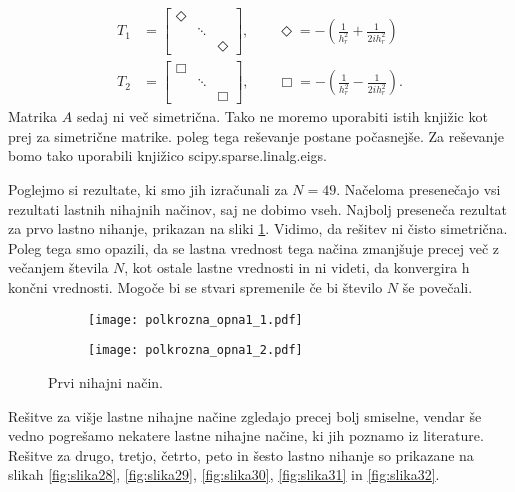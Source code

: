 \documentclass[12pt,a4paper]{article}
\begin{document}
\begin{align*}
T_1 & = \begin{bmatrix}
\Diamond &  & \\
 & \ddots  & \\
 &  &  \Diamond
\end{bmatrix}, \qquad \Diamond = -\left( \frac{1}{h_r ^{2}} +  \frac{1}{2ih_r^{2}} \right) \\
T_2 & = \begin{bmatrix}
\Box &  & \\
 & \ddots  & \\
 &  &  \Box
\end{bmatrix}, \qquad \Box = -\left( \frac{1}{h_r ^{2}} -  \frac{1}{2ih_r^{2}} \right).
\end{align*}
Matrika $A$ sedaj ni več simetrična. Tako ne moremo uporabiti istih knjižic kot prej za simetrične matrike. poleg tega reševanje postane počasnejše. Za reševanje bomo tako uporabili knjižico \textsf{scipy.sparse.linalg.eigs}.

Poglejmo si rezultate, ki smo jih izračunali za $N=49$. Načeloma presenečajo vsi rezultati lastnih nihajnih načinov, saj ne dobimo vseh. Najbolj preseneča rezultat za prvo lastno nihanje, prikazan na sliki \ref{fig:slika27}. Vidimo, da rešitev ni čisto simetrična. Poleg tega smo opazili, da se lastna vrednost tega načina zmanjšuje precej več z večanjem števila $N$, kot ostale lastne vrednosti in ni videti, da konvergira h končni vrednosti. Mogoče bi se stvari spremenile če bi število $N$ še povečali.

\begin{figure}[H]
    \centering
    \begin{subfigure}[b]{0.49\textwidth}
        \texttt{[image: polkrozna\_opna1\_1.pdf]}
    \end{subfigure}
    \begin{subfigure}[b]{0.49\textwidth}
        \texttt{[image: polkrozna\_opna1\_2.pdf]}
    \end{subfigure}
    \caption{Prvi nihajni način.} \label{fig:slika27}
\end{figure}

Rešitve za višje lastne nihajne načine zgledajo precej bolj smiselne, vendar še vedno pogrešamo nekatere lastne nihajne načine, ki jih poznamo iz literature. Rešitve za drugo, tretjo, četrto, peto in šesto lastno nihanje so prikazane na slikah \ref{fig:slika28}, \ref{fig:slika29}, \ref{fig:slika30}, \ref{fig:slika31} in \ref{fig:slika32}.
\end{document}
